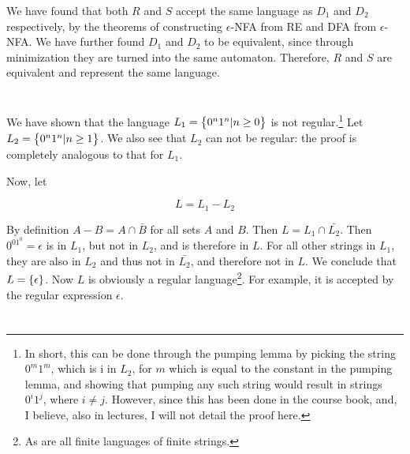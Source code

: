 \documentclass{article}
\begin{document}
We have found that both $R$ and $S$ accept the same language as $D_1$ and $D_2$ respectively, by the theorems of constructing $\epsilon$-NFA from RE and DFA from $\epsilon$-NFA. We have further found $D_1$ and $D_2$ to be equivalent, since through minimization they are turned into the same automaton. Therefore, $R$ and $S$ are equivalent and represent the same language.

\newpage
\section{}

We have shown that the language $L_1 = \set{0^n1^n | n \geq 0}$ is not
regular.\footnote{In short, this can be done through the pumping lemma by
picking the string $0^m1^m$, which is i in $L_2$, for $m$ which is equal to the
constant in the pumping lemma, and showing that pumping any such string would
result in strings $0^i1^j$, where $i \neq j$. However, since this has been done
in the course book, and, I believe, also in lectures, I will not detail the
proof here.} Let $L_2 = \set{0^n1^n | n \geq 1}$.  We also
see that $L_2$ can not be regular: the proof is completely analogous to that for $L_1$.

Now, let

$$L = L_1 - L_2$$

By definition $A - B = A \cap \bar{B}$ for all sets $A$ and $B$. Then $L = L_1
\cap \bar{L_2}$. Then $0^01^0=\epsilon$ is in $L_1$, but not in $L_2$,
and is therefore in $L$. For all other strings in $L_1$,
they are also in $L_2$ and thus not in $\bar{L_2}$, and therefore not in $L$.
We conclude that $L = \set{\epsilon}$. Now $L$ is obviously a regular
language\footnote{As are all finite languages of finite strings.}. For example,
it is accepted by the regular expression $\mathbb{\epsilon}$.

\newpage
\section{}
\end{document}
